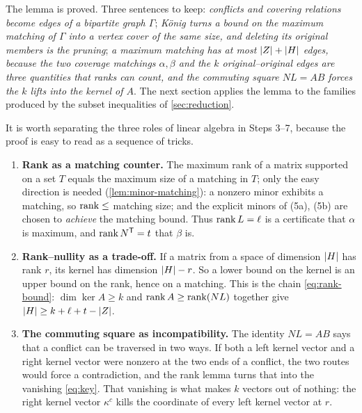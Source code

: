 \begin{checkpoint}
The lemma is proved. Three sentences to keep: \emph{conflicts and covering relations become edges of
a bipartite graph $\Gamma$}; \emph{K\"onig turns a bound on the maximum matching of $\Gamma$ into a
vertex cover of the same size, and deleting its original members is the pruning}; \emph{a maximum
matching has at most $\lvert Z\rvert+\lvert H\rvert$ edges, because the two coverage matchings $\alpha,\beta$ and the
$k$ original--original edges are three quantities that ranks can count, and the commuting square
$NL=AB$ forces the $k$ lifts into the kernel of $A$}. The next section applies the lemma to the
families produced by the subset inequalities of \cref{sec:reduction}.
\end{checkpoint}

\begin{remark}\label{rem:rank-philosophy}
It is worth separating the three roles of linear algebra in Steps 3--7, because the proof is easy to
read as a sequence of tricks.
\begin{enumerate}[leftmargin=1.3em,itemsep=2pt,topsep=1pt]
\item \textbf{Rank as a matching counter.} The maximum rank of a matrix supported on a set $T$ equals
  the maximum size of a matching in $T$; only the easy direction is needed
  (\cref{lem:minor-matching}): a nonzero
  minor exhibits a matching, so $\operatorname{rank}\le$ matching size; and the explicit minors of (5a), (5b) are
  chosen to \emph{achieve} the matching bound. Thus $\operatorname{rank} L=\ell$ is a certificate that
  $\alpha$ is maximum, and $\operatorname{rank} N^{\mathsf T}=t$ that $\beta$ is.
\item \textbf{Rank--nullity as a trade-off.} If a matrix from a space of dimension $\lvert H\rvert$ has rank
  $r$, its kernel has dimension $\lvert H\rvert-r$. So a lower bound on the kernel is an upper bound on the
  rank, hence on a matching. This is the chain \eqref{eq:rank-bound}: $\dim\ker A\ge k$ and
  $\operatorname{rank} A\ge\operatorname{rank}(NL)$ together give $\lvert H\rvert\ge k+\ell+t-\lvert Z\rvert$.
\item \textbf{The commuting square as incompatibility.} The identity $NL=AB$ says that a conflict can
  be traversed in two ways. If both a left kernel vector and a right kernel vector were nonzero at the
  two ends of a conflict, the two routes would force a contradiction, and the rank lemma turns that
  into the vanishing \eqref{eq:key}. That vanishing is what makes $k$ vectors out of nothing: the
  right kernel vector $\kappa^c$ kills the coordinate of every left kernel vector at $r$.
\end{enumerate}
\end{remark}
